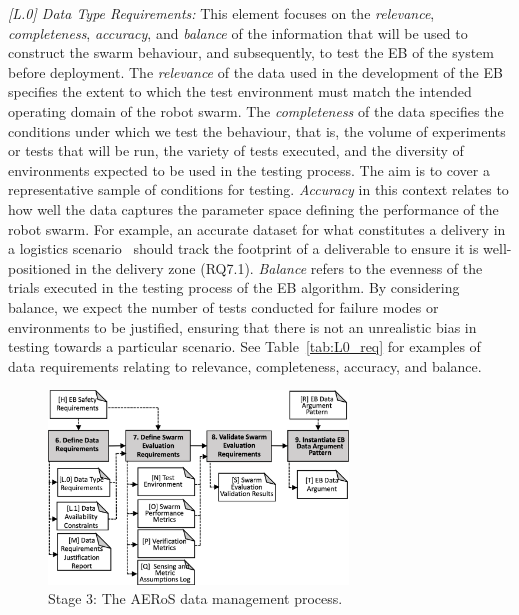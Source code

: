 \documentclass[runningheads]{llncs}
\begin{document}
\emph{[L.0] Data Type Requirements:}
This element focuses on the \emph{relevance}, \emph{completeness}, \emph{accuracy}, and \emph{balance} of the information that will be used to construct the swarm behaviour, and subsequently, to test the EB of the system before deployment. The \emph{relevance} of the data used in the development of the EB specifies the extent to which the test environment must match the intended operating domain of the robot swarm. The \emph{completeness} of the data specifies the conditions under which we test the behaviour, that is, the volume of experiments or tests that will be run, the variety of tests executed, and the diversity of environments expected to be used in the testing process. The aim is to cover a representative sample of conditions for testing. 
\emph{Accuracy} in this context relates to how well the data captures the parameter space defining the performance of the robot swarm. For example, an accurate dataset for what constitutes a delivery in a logistics scenario~\cite{milner2022stochastic} should track the footprint of a deliverable to ensure it is well-positioned in the delivery zone (RQ7.1). 
\emph{Balance} refers to the evenness of the trials executed in the testing process of the EB algorithm. By considering balance, we expect the number of tests conducted for failure modes or environments to be justified, ensuring that there is not an unrealistic bias in testing towards a particular scenario. See Table~\ref{tab:L0_req} for examples of data requirements relating to relevance, completeness, accuracy, and balance.

\begin{figure}[!b]%
	\centering
	\vspace{-5ex} %
	\includegraphics[width=0.71\textwidth]{figures/AERoS-Stage3.png}%
	\vspace{-2ex} %
	\caption{Stage 3: The AERoS data management process.}
	\label{amlas-a-stage3}
	\vspace{-4ex} %
\end{figure}
\end{document}
